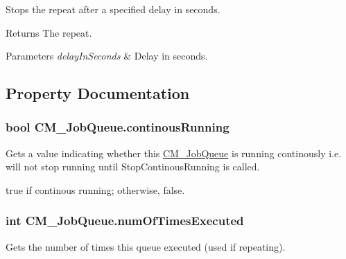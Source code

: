 Stops the repeat after a specified delay in seconds. 

\begin{DoxyReturn}{Returns}
The repeat.
\end{DoxyReturn}

\begin{DoxyParams}{Parameters}
{\em delay\+In\+Seconds} & Delay in seconds.\\
\hline
\end{DoxyParams}


\subsection{Property Documentation}
\hypertarget{class_c_m___job_queue_a93ffe57018263669329b70e523ac8fa1}{}
\subsubsection[{continous\+Running}]{\setlength{\rightskip}{0pt plus 5cm}bool C\+M\+\_\+\+Job\+Queue.\+continous\+Running\hspace{0.3cm}{\ttfamily [get]}}\label{class_c_m___job_queue_a93ffe57018263669329b70e523ac8fa1}


Gets a value indicating whether this \hyperlink{class_c_m___job_queue}{C\+M\+\_\+\+Job\+Queue} is running continously i.\+e. will not stop running until Stop\+Continous\+Running is called. 

{\ttfamily true} if continous running; otherwise, {\ttfamily false}.\hypertarget{class_c_m___job_queue_a09c449c39674203848e7d939e3742460}{}
\subsubsection[{num\+Of\+Times\+Executed}]{\setlength{\rightskip}{0pt plus 5cm}int C\+M\+\_\+\+Job\+Queue.\+num\+Of\+Times\+Executed\hspace{0.3cm}{\ttfamily [get]}}\label{class_c_m___job_queue_a09c449c39674203848e7d939e3742460}


Gets the number of times this queue executed (used if repeating). 

